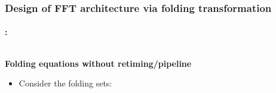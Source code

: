 \begin{frame}
	\frametitle{\textbf{Design of FFT architecture via folding transformation}}
	\framesubtitle{\secname : \subsecname}
		\vspace{-0.5cm}
	    \begin{columns}[t,onlytextwidth]
	      \begin{column}{0.45\linewidth}
			\begin{block}{\centering \textbf{Folding equations without retiming/pipeline}}	      	
	        	\begin{itemize} \justifying\footnotesize
					\item Consider the folding sets:  \vfill
				

\end{itemize}
\end{block}
\end{column}
\end{columns}
\end{frame}
